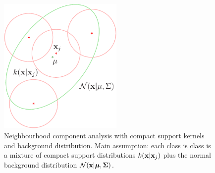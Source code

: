 \begin{figure}
  \centering\includegraphics[width=6cm]{images/nca-cs-back}
  \caption{Neighbourhood component analysis with compact support kernels and background distribution. Main assumption: each class is class is a mixture of compact support distributions $k(\mathbf{x}|\mathbf{x}_j)$ plus the normal background distribution $\mathcal{N}(\mathbf{x}|\mbox{\boldmath $\mu$},\mbox{\boldmath $\Sigma$})$.}
  \label{fig:cs-back}
\end{figure}

